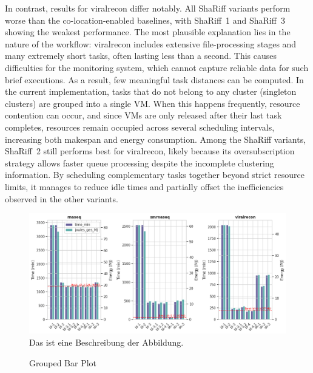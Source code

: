 In contrast, results for viralrecon differ notably. All ShaRiff variants perform worse than the co-location-enabled baselines, with ShaRiff~1 and ShaRiff~3 showing the weakest performance. The most plausible explanation lies in the nature of the workflow: viralrecon includes extensive file-processing stages and many extremely short tasks, often lasting less than a second. This causes difficulties for the monitoring system, which cannot capture reliable data for such brief executions. As a result, few meaningful task distances can be computed. In the current implementation, tasks that do not belong to any cluster (singleton clusters) are grouped into a single VM. When this happens frequently, resource contention can occur, and since VMs are only released after their last task completes, resources remain occupied across several scheduling intervals, increasing both makespan and energy consumption.
Among the ShaRiff variants, ShaRiff~2 still performs best for viralrecon, likely because its oversubscription strategy allows faster queue processing despite the incomplete clustering information. By scheduling complementary tasks together beyond strict resource limits, it manages to reduce idle times and partially offset the inefficiencies observed in the other variants.

\begin{figure}[H]
    \caption{Grouped Bar Plot}
    \includegraphics[scale=0.5]{fig/06/06-grouped-bar-3wfs.png}
    \label{fig:grouped_bar_3wfs}
    \newline
    \tiny
    Das ist eine Beschreibung der Abbildung.
\end{figure}

